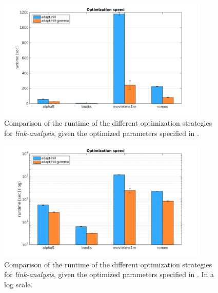 \begin{figure}[h!]
    \centering
    \includegraphics[width=0.9\textwidth]{fig/comp/comp_link_speed.png}
    \caption{Comparison of the runtime of the different optimization strategies for \textit{link-analysis}, given the optimized parameters specified in .}
\end{figure}

\begin{figure}[h!]
    \centering
    \includegraphics[width=0.9\textwidth]{fig/comp/comp_link_speed_log.png}
    \caption{Comparison of the runtime of the different optimization strategies for \textit{link-analysis}, given the optimized parameters specified in . In a log scale.}
\end{figure}

\FloatBarrier
